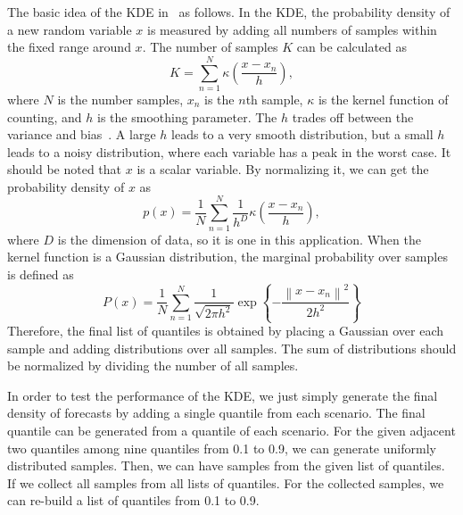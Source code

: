 \documentclass[journal]{IEEEtran} %
\begin{document}
The basic idea of the KDE in~\cite{Duda} as follows. In the KDE, the probability density of a new random variable $x$ is measured by adding all numbers of samples within the fixed range around $x$. The number of samples $K$ can be calculated as
\begin{equation}
\label{K}
K = \sum\limits_{n = 1}^N {\kappa  \left( {\frac{{x - {x_n}}}{h}} \right)},
\end{equation}
where $N$ is the number samples, $x_n$ is the $n$th sample, $\kappa$ is the kernel function of counting, and $h$ is the smoothing parameter. The $h$ trades off between the variance and bias~\cite{Bishop}. A large $h$ leads to a very smooth distribution, but a small $h$ leads to a noisy distribution, where each variable has a peak in the worst case.
It should be noted that $x$ is a scalar variable. By normalizing it, we can get the probability density of $x$ as
\begin{equation}
\label{K_PDF}
p(x) = \frac{1}{N}\sum\limits_{n = 1}^N {\frac{1}{{{h^D}}}\kappa \left( {\frac{{x - {x_n}}}{h}} \right)},
\end{equation}
where $D$ is the dimension of data, so it is one in this application.
When the kernel function is a Gaussian distribution, the marginal probability over samples is defined as
\begin{equation}
\label{GaussianCase}
P(x) = \frac{1}{N}\sum\limits_{n = 1}^N {\frac{1}{{\sqrt {2\pi {h^2}} }}\exp \left\{ { - \frac{{{{\left\| {x - {x_n}} \right\|}^2}}}{{2{h^2}}}} \right\}}
\end{equation}
Therefore, the final list of quantiles is obtained by placing a Gaussian over each sample and adding distributions over all samples. The sum of distributions should be normalized by dividing the number of all samples.





In order to test the performance of the KDE, we just simply generate the final density of forecasts by adding a single quantile from each scenario. The final quantile can be generated from a quantile of each scenario. For the given adjacent two quantiles among nine quantiles from 0.1 to 0.9, we can generate uniformly distributed samples. Then, we can have samples from the given list of quantiles. If we collect all samples from all lists of quantiles. For the collected samples, we can re-build a list of quantiles from 0.1 to 0.9.
\end{document}
